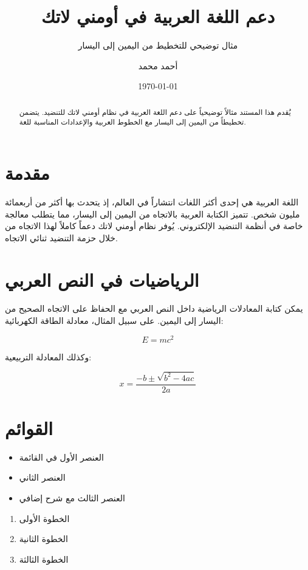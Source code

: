 \documentclass[doctype=article,language=arabic]{../../omnilatex}
\title{دعم اللغة العربية في أومني لاتك}
\subtitle{مثال توضيحي للتخطيط من اليمين إلى اليسار}
\author{أحمد محمد}
\date{\today}
\begin{document}
\maketitle

\begin{abstract}
يُقدم هذا المستند مثالاً توضيحياً على دعم اللغة العربية في نظام
أومني لاتك للتنضيد. يتضمن تخطيطاً من اليمين إلى اليسار مع الخطوط
العربية والإعدادات المناسبة للغة.
\end{abstract}

\section{مقدمة}

اللغة العربية هي إحدى أكثر اللغات انتشاراً في العالم، إذ يتحدث بها
أكثر من أربعمائة مليون شخص. تتميز الكتابة العربية بالاتجاه من اليمين
إلى اليسار، مما يتطلب معالجة خاصة في أنظمة التنضيد الإلكتروني.
يُوفر نظام أومني لاتك دعماً كاملاً لهذا الاتجاه من خلال حزمة
التنضيد ثنائي الاتجاه.

\section{الرياضيات في النص العربي}

يمكن كتابة المعادلات الرياضية داخل النص العربي مع الحفاظ على
الاتجاه الصحيح من اليسار إلى اليمين. على سبيل المثال، معادلة
الطاقة الكهربائية:

\begin{equation}
  E = mc^{2}
  \label{eq:energy}
\end{equation}

وكذلك المعادلة التربيعية:

\begin{equation}
  x = \frac{-b \pm \sqrt{b^{2} - 4ac}}{2a}
  \label{eq:quadratic}
\end{equation}

\section{القوائم}

\begin{itemize}
  \item العنصر الأول في القائمة
  \item العنصر الثاني
  \item العنصر الثالث مع شرح إضافي
\end{itemize}

\begin{enumerate}
  \item الخطوة الأولى
  \item الخطوة الثانية
  \item الخطوة الثالثة
\end{enumerate}
\end{document}
